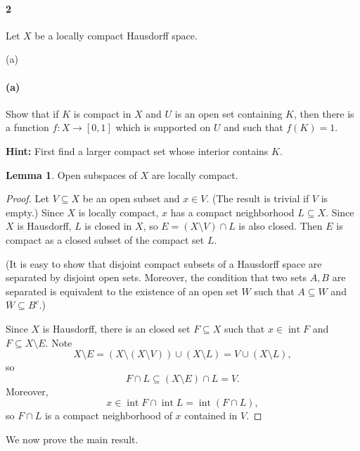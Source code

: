 \documentclass[12pt]{article}
\newlength{\myparskip}
\newenvironment{fullbox}{\begin{lrbox}{\savefullbox}\begin{minipage}{\dimexpr\textwidth-2\fboxsep\relax}\setlength{\parskip}{\myparskip}}{\end{minipage}\end{lrbox}\framebox[\textwidth]{\usebox{\savefullbox}}}
\newenvironment{pbox}[1][]{\begin{fullbox}\ifx#1\empty\else\paragraph{#1}\fi}{\end{fullbox}}
\theoremstyle{definition}
\newtheorem{lemma}{Lemma}
\newcommand{\<}{\langle}
\renewcommand{\>}{\rangle}
\newcommand{\clo}{\overline}
\DeclareMathOperator{\inter}{int}
\begin{document}
\newpage
\begin{pbox}[2]
    Let $X$ be a locally compact Hausdorff space.
\end{pbox}

\begin{pbox}[(a)]
    Show that if $K$ is compact in $X$ and $U$ is an open set containing $K$,
    then there is a function $f:X \to [0,1]$ which is supported on $U$ and such
    that $f(K)=1$.

    \textbf{Hint:} First find a larger compact set whose interior contains $K$.
\end{pbox}

\begin{lemma}
    Open subspaces of $X$ are locally compact.
\end{lemma}

\begin{proof}
    Let $V \subseteq X$ be an open subset and $x \in V$.
    (The result is trivial if $V$ is empty.)
    Since $X$ is locally compact, $x$ has a compact neighborhood $L \subseteq X$.
    Since $X$ is Hausdorff, $L$ is closed in $X$, so $E = (X \setminus V) \cap L$ is also closed.
    Then $E$ is compact as a closed subset of the compact set $L$.
    
    (It is easy to show that disjoint compact subsets of a Hausdorff space are separated by disjoint open sets. Moreover, the condition that two sets $A, B$ are separated is equivalent to the existence of an open set $W$ such that $A \subseteq W$ and $\clo{W} \subseteq B^c$.)
    
    Since $X$ is Hausdorff, there is an closed set $F \subseteq X$ such that $x \in \inter F$ and $F \subseteq X \setminus E$.
    Note
    \[
        X \setminus E
            = (X \setminus (X \setminus V)) \cup (X \setminus L)
            = V \cup (X \setminus L),
    \]
    so
    \[
        F \cap L
            \subseteq (X \setminus E) \cap L
            = V.
    \]
    Moreover,
    \[
        x \in \inter F \cap \inter L = \inter (F \cap L),
    \]
    so $F \cap L$ is a compact neighborhood of $x$ contained in $V$.
\end{proof}

We now prove the main result.
\end{document}
